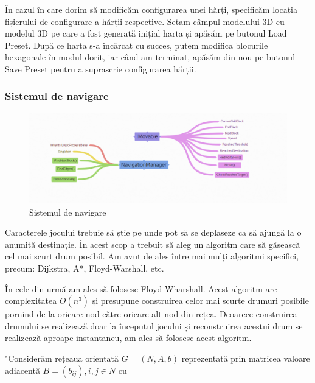 \documentclass[12pt, a4paper]{article}
\begin{document}
	În cazul în care dorim să modificăm configurarea unei hărți, specificăm locația fișierului de configurare a hărții respective. Setam câmpul modelului 3D cu modelul 3D pe care a fost generată inițial harta și apăsăm pe butonul Load Preset. După ce harta s-a încărcat cu succes, putem modifica blocurile hexagonale în modul dorit, iar când am terminat, apăsăm din nou pe butonul Save Preset pentru a suprascrie configurarea hărții.
	\newline
	
	
	
	
	
	\subsubsection{Sistemul de navigare}

	\begin{figure}[H]
		\centering
		\includegraphics[width=1\textwidth]{navigationCoggle.png}
		\caption{Sistemul de navigare}
		\label{fig: navigationManager}
	\end{figure}

	Caracterele jocului trebuie să știe pe unde pot să se deplaseze ca să ajungă la o anumită destinație. În acest scop a trebuit să aleg un algoritm care să găsească cel mai scurt drum posibil. Am avut de ales între mai mulți algoritmi specifici, precum: Dijkstra, A*, Floyd-Warshall, etc.
	\newline
	
 	În cele din urmă am ales să folosesc Floyd-Wharshall. Acest algoritm are complexitatea $O(n^3)$ și presupune construirea celor mai scurte drumuri posibile pornind de la oricare nod către oricare alt nod din rețea. Deoarece construirea drumului se realizează doar la începutul jocului și reconstruirea acestui drum se realizează aproape instantaneu, am ales să folosesc acest algoritm.
	\newline
	
	"Considerăm rețeaua orientată $G = (N, A, b)$ reprezentată prin matricea valoare adiacentă $B = (b_{ij}), i, j \in N$ cu
	
\end{document}

